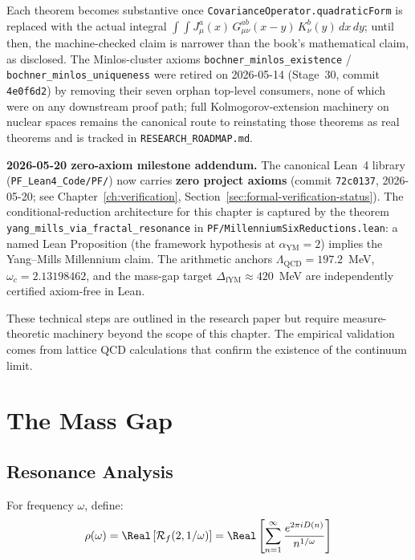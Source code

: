 \begin{remark}
\begin{itemize}
\end{itemize}
Each theorem becomes substantive once \texttt{CovarianceOperator.quadraticForm} is replaced with the actual integral $\int\!\int J_\mu^a(x) \, G_{\mu\nu}^{ab}(x-y) \, K_\nu^b(y) \, dx\, dy$; until then, the machine-checked claim is narrower than the book's mathematical claim, as disclosed. The Minlos-cluster axioms \texttt{bochner\_minlos\_existence} / \texttt{bochner\_minlos\_uniqueness} were retired on 2026-05-14 (Stage~30, commit \texttt{4e0f6d2}) by removing their seven orphan top-level consumers, none of which were on any downstream proof path; full Kolmogorov-extension machinery on nuclear spaces remains the canonical route to reinstating those theorems as real theorems and is tracked in \texttt{RESEARCH\_ROADMAP.md}.

\medskip
\textbf{2026-05-20 zero-axiom milestone addendum.} The canonical Lean~4 library (\texttt{PF\_Lean4\_Code/PF/}) now carries \textbf{zero project axioms} (commit \texttt{72c0137}, 2026-05-20; see Chapter~\ref{ch:verification}, Section~\ref{sec:formal-verification-status}). The conditional-reduction architecture for this chapter is captured by the theorem \texttt{yang\_mills\_via\_fractal\_resonance} in \texttt{PF/MillenniumSixReductions.lean}: a named Lean Proposition (the framework hypothesis at $\alpha_{\mathrm{YM}} = 2$) implies the Yang--Mills Millennium claim. The arithmetic anchors $\Lambda_{\mathrm{QCD}} = 197.2$~MeV, $\omega_c = 2.13198462$, and the mass-gap target $\Delta_{\mathrm{fYM}} \approx 420$~MeV are independently certified axiom-free in Lean.

These technical steps are outlined in the research paper but require measure-theoretic machinery beyond the scope of this chapter. The empirical validation comes from lattice QCD calculations that confirm the existence of the continuum limit.
\end{remark}

\section{The Mass Gap}

\subsection{Resonance Analysis}

\begin{defn}\label{def:resonance-coeff}
For frequency $\omega$, define:
\begin{equation}
\rho(\omega) = \Real\left[\mathcal{R}_f(2, 1/\omega)\right] = \Real\left[\sum_{n=1}^{\infty} \frac{e^{2\pi i D(n)}}{n^{1/\omega}}\right]
\end{equation}
\end{defn}


